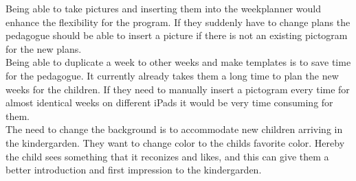 Being able to take pictures and inserting them into the weekplanner would enhance the flexibility for the program.
If they suddenly have to change plans the pedagogue should be able to insert a picture if there is not an existing pictogram for the new plans.
\\
Being able to duplicate a week to other weeks and make templates is to save time for the pedagogue. 
It currently already takes them a long time to plan the new weeks for the children. 
If they need to manually insert a pictogram every time for almost identical weeks on different iPads it would be very time consuming for them.
\\
The need to change the background is to accommodate new children arriving in the kindergarden. 
They want to change color to the childs favorite color. 
Hereby the child sees something that it reconizes and likes, and this can give them a better introduction and first impression to the kindergarden.

